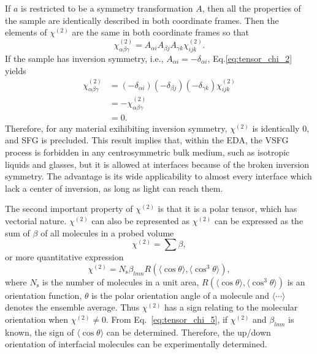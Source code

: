 If $a$ is restricted to be a symmetry transformation $A$, then all the properties of the sample are identically described in both coordinate frames.
Then the elements of $\chi^{(2)}$ are the same in both coordinate frames so that
\begin{equation}
\chi^{(2)}_{\alpha\beta\gamma} = A_{\alpha i}A_{\beta j}A_{\gamma k}\chi^{(2)}_{ijk}.
\label{eq:tensor_chi_2}
\end{equation}
If the sample has inversion symmetry\cite{Franken1963}, i.e., $A_{\alpha i} = -\delta_{\alpha i}$, Eq.\thinspace\ref{eq:tensor_chi_2} yields
\begin{align}
\chi^{(2)}_{\alpha\beta\gamma} &= (-\delta_{\alpha i}) (-\delta_{\beta j}) (-\delta_{\gamma k})\chi^{(2)}_{ijk} \nonumber\\
    & = -\chi^{(2)}_{\alpha\beta\gamma} \nonumber\\
    & = 0.
\label{eq:tensor_chi_3}
\end{align}
Therefore, for any material exihibiting inversion symmetry, $\chi^{(2)}$ is identically 0, and SFG is precluded.
This result implies that, within the EDA, the VSFG process is forbidden in any centrosymmetric bulk medium\cite{Che2012},
such as isotropic liquids and glasses, but it is allowed at interfaces because of the broken inversion symmetry\cite{PF00}.
The advantage is its wide applicability to almost every interface which lack a center of inversion, as long as light can reach them. 

%
The second important property of $\chi^{(2)}$ is that it is a polar tensor, which has vectorial nature.\cite{Nihonyanagi2013} 
$\chi^{(2)}$ can also be represented as
$\chi^{(2)}$ can be expressed as the sum of $\beta$ of all molecules in a probed volume
\begin{equation}
\chi^{(2)} = \sum \beta, \nonumber
\label{eq:tensor_chi_4}
\end{equation}
or more quantitative expression
\begin{equation}
\chi^{(2)} = N_\text{s} \beta_{lmn} R(\langle \cos\theta\rangle, \langle \cos^3\theta\rangle),
\label{eq:tensor_chi_5}
\end{equation}
where $N_\text{s}$ is the number of molecules in a unit area, $R(\langle \cos\theta\rangle, \langle \cos^3\theta\rangle)$ is an orientation function,
$\theta$ is the polar orientation angle of a molecule and $\langle \cdots \rangle$ denotes the ensemble average.
Thus $\chi^{(2)}$ has a sign relating to the molecular orientation when $\chi^{(2)}\neq 0$. 
From Eq.~\ref{eq:tensor_chi_5}, if $\chi^{(2)}$ and $\beta_{lmn}$ is known, the sign of $\langle \cos\theta\rangle$ can be determined. 
Therefore, the up/down orientation of interfacial molecules can be experimentally determined.


